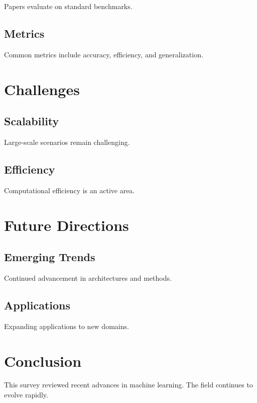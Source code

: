 \documentclass[11pt,a4paper]{article}
\begin{document}
Papers evaluate on standard benchmarks.

\subsection{{Metrics}}

Common metrics include accuracy, efficiency, and generalization.



\section{{Challenges}}

\subsection{{Scalability}}

Large-scale scenarios remain challenging.

\subsection{{Efficiency}}

Computational efficiency is an active area.



\section{{Future Directions}}

\subsection{{Emerging Trends}}

Continued advancement in architectures and methods.

\subsection{{Applications}}

Expanding applications to new domains.



\section{Conclusion}

This survey reviewed recent advances in machine learning. The field continues to evolve rapidly.
\end{document}
